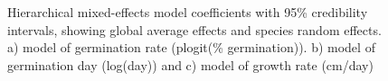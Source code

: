 \documentclass[12pt]{article}\usepackage[]{graphicx}\usepackage[]{color}
\begin{document}
\begin{figure}
	\caption{Hierarchical mixed-effects model coefficients with 95\% credibility intervals, showing global average effects and species random effects. a) model of germination rate (plogit(\% germination)). b) model of germination day (log(day)) and c) model of growth rate (cm/day)}
	\label{fig:coef}
\end{figure}
	
%	
%
%	
		
\end{document}
